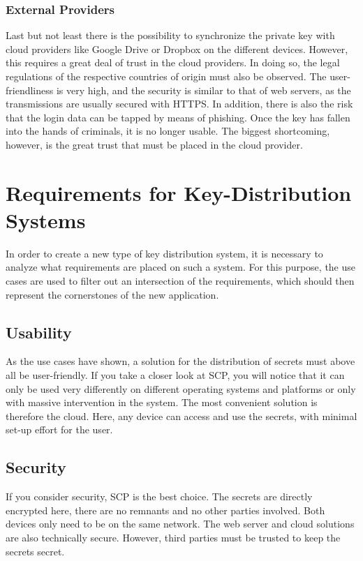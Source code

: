 \documentclass[12pt,oneside,a4paper,parskip]{scrbook}
\begin{document}
\subsection{External Providers}
Last but not least there is the possibility to synchronize the private key with cloud providers like Google Drive or Dropbox on the different devices. However, this requires a great deal of trust in the cloud providers. In doing so, the legal regulations of the respective countries of origin must also be observed.
The user-friendliness is very high, and the security is similar to that of web servers, as the transmissions are usually secured with HTTPS. In addition, there is also the risk that the login data can be tapped by means of phishing. Once the key has fallen into the hands of criminals, it is no longer usable. The biggest shortcoming, however, is the great trust that must be placed in the cloud provider. 


\chapter{Requirements for Key-Distribution Systems}
In order to create a new type of key distribution system, it is necessary to analyze what requirements are placed on such a system. For this purpose, the use cases are used to filter out an intersection of the requirements, which should then represent the cornerstones of the new application.

\section{Usability}
As the use cases have shown, a solution for the distribution of secrets must above all be user-friendly. If you take a closer look at SCP, you will notice that it can only be used very differently on different operating systems and platforms or only with massive intervention in the system. The most convenient solution is therefore the cloud. Here, any device can access and use the secrets, with minimal set-up effort for the user.

\section{Security}
If you consider security, SCP is the best choice. The secrets are directly encrypted here, there are no remnants and no other parties involved. Both devices only need to be on the same network. The web server and cloud solutions are also technically secure. However, third parties must be trusted to keep the secrets secret. 
\end{document}
